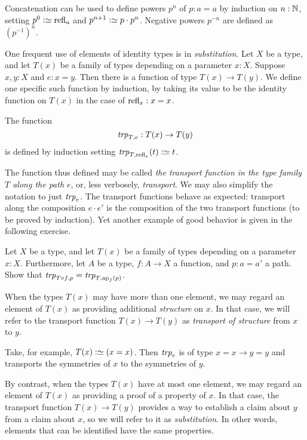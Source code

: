 Concatenation can be used to define powers $p^n$ of $p:a=a$
by induction on $n:\mathbb{N}$, setting $p^0\defeq\refl{a}$ and
$p^{n+1}\defeq p\cdot p^n$. Negative powers $p^{-n}$ are defined
as $(p^{-1})^n$.

One frequent use of elements of identity types is in \emph{substitution}.  
Let $X$ be a type, and let $T(x)$ be a family of types depending on a
parameter $x:X$.  Suppose $x,y:X$ and $e:x=y$.  
Then there is a function of type $T(x) \to T(y)$. 
We define one specific such function by induction, 
by taking its value to be the identity function on $T(x)$ 
in the case of $\refl{x}:x=x$.

\begin{definition}\label{def:transport} The function
  \[ 
  \trp[T]{e} : T(x) \to T(y)
  \]
  is defined by induction setting $\trp[T]{\refl{x}} (t) \defeq t$.
\end{definition} 
The function thus defined may be called 
\emph{the transport function in the type family $T$ along the path $e$}, 
 or, less verbosely, \emph{transport}.
 We may also simplify the notation to just $\trp e$.
The transport functions behave as expected: transport along the composition
$e\cdot e'$ is the composition of the two transport functions (to be
proved by induction). Yet another example of good behavior is given
in the following exercise.

\begin{xca}\label{xca:trp-ap}
Let $X$ be a type, and let $T(x)$ be a family of types depending on a
parameter $x:X$. Furthermore, let $A$ be a type, $f:A\to X$ a function, 
and $p: a=a'$ a path. Show that $\trp[T\circ f]{ p} = \trp[T]{\ap{f}(p)}$. 
\end{xca}


When the types $T(x)$ may have more than one element, 
we may regard an element of $T(x)$ as providing additional {\em structure} on $x$. 
In that case, we will refer to the transport function $T(x) \to T(y)$ as 
\emph{transport of structure} from $x$ to $y$. 

Take, for example, $T(x)\defeq (x=x)$. 
Then $\trp e$ is of type $x=x \to y=y$ and transports the
symmetries of $x$ to the symmetries of $y$.

By contrast, when the types
$T(x)$ have at most one element, we may regard an element of $T(x)$ 
as providing a proof of a property of $x$. In that case, the transport
function $T(x) \to T(y)$ provides a way to establish a claim about $y$ 
from a claim about $x$, so we will refer to it as \emph{substitution}.  In
other words, elements that can be identified have the same properties.


